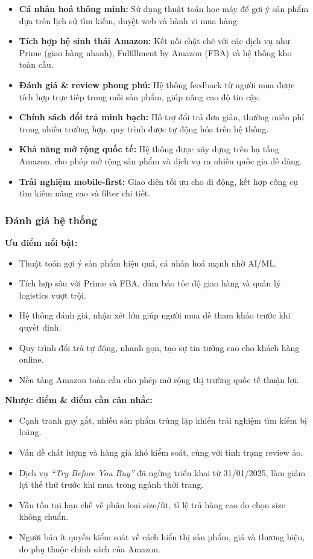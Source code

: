 \begin{itemize}
  \item \textbf{Cá nhân hoá thông minh:} Sử dụng thuật toán học máy để gợi ý sản phẩm dựa trên lịch sử tìm kiếm, duyệt web và hành vi mua hàng.
  \item \textbf{Tích hợp hệ sinh thái Amazon:} Kết nối chặt chẽ với các dịch vụ như Prime (giao hàng nhanh), Fulfillment by Amazon (FBA) và hệ thống kho toàn cầu.
  \item \textbf{Đánh giá \& review phong phú:} Hệ thống feedback từ người mua được tích hợp trực tiếp trong mỗi sản phẩm, giúp nâng cao độ tin cậy.
  \item \textbf{Chính sách đổi trả minh bạch:} Hỗ trợ đổi trả đơn giản, thường miễn phí trong nhiều trường hợp, quy trình được tự động hóa trên hệ thống.
  \item \textbf{Khả năng mở rộng quốc tế:} Hệ thống được xây dựng trên hạ tầng Amazon, cho phép mở rộng sản phẩm và dịch vụ ra nhiều quốc gia dễ dàng.
  \item \textbf{Trải nghiệm mobile-first:} Giao diện tối ưu cho di động, kết hợp công cụ tìm kiếm nâng cao và filter chi tiết.
\end{itemize}

\subsubsection{Đánh giá hệ thống}

\textbf{Ưu điểm nổi bật:}
\begin{itemize}
  \item Thuật toán gợi ý sản phẩm hiệu quả, cá nhân hoá mạnh nhờ AI/ML.
  \item Tích hợp sâu với Prime và FBA, đảm bảo tốc độ giao hàng và quản lý logistics vượt trội.
  \item Hệ thống đánh giá, nhận xét lớn giúp người mua dễ tham khảo trước khi quyết định.
  \item Quy trình đổi trả tự động, nhanh gọn, tạo sự tin tưởng cao cho khách hàng online.
  \item Nền tảng Amazon toàn cầu cho phép mở rộng thị trường quốc tế thuận lợi.
\end{itemize}

\textbf{Nhược điểm \& điểm cần cân nhắc:}
\begin{itemize}
  \item Cạnh tranh gay gắt, nhiều sản phẩm trùng lặp khiến trải nghiệm tìm kiếm bị loãng.
  \item Vấn đề chất lượng và hàng giả khó kiểm soát, cùng với tình trạng review ảo.
  \item Dịch vụ \textit{“Try Before You Buy”} đã ngừng triển khai từ 31/01/2025, làm giảm lợi thế thử trước khi mua trong ngành thời trang.
  \item Vẫn tồn tại hạn chế về phân loại size/fit, tỉ lệ trả hàng cao do chọn size không chuẩn.
  \item Người bán ít quyền kiểm soát về cách hiển thị sản phẩm, giá và thương hiệu, do phụ thuộc chính sách của Amazon.
\end{itemize}
